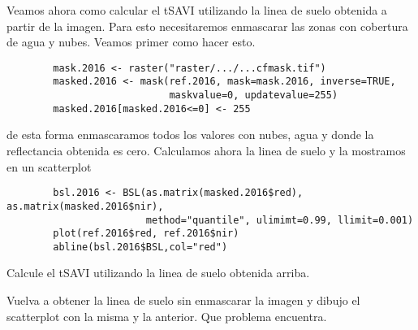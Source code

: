 \documentclass[a4paper]{article}
\begin{document}
\begin{exa}
    Veamos ahora como calcular el tSAVI utilizando la linea de suelo obtenida a
    partir de la imagen. Para esto necesitaremos enmascarar las zonas con
    cobertura de agua y nubes. Veamos primer como hacer esto.
    \begin{lstlisting}
        mask.2016 <- raster("raster/.../...cfmask.tif")
        masked.2016 <- mask(ref.2016, mask=mask.2016, inverse=TRUE,
                            maskvalue=0, updatevalue=255)
        masked.2016[masked.2016<=0] <- 255
    \end{lstlisting}
    de esta forma enmascaramos todos los valores con nubes, agua y donde la
    reflectancia obtenida es cero.
    Calculamos ahora la linea de suelo y la mostramos en un scatterplot
    \begin{lstlisting}
        bsl.2016 <- BSL(as.matrix(masked.2016$red), as.matrix(masked.2016$nir),
                        method="quantile", ulimimt=0.99, llimit=0.001)
        plot(ref.2016$red, ref.2016$nir)
        abline(bsl.2016$BSL,col="red")
    \end{lstlisting}
\end{exa}

\begin{act}
    Calcule el tSAVI utilizando la linea de suelo obtenida arriba.
\end{act}

\begin{act}
    Vuelva a obtener la linea de suelo sin enmascarar la imagen y dibujo el
    scatterplot con la misma y la anterior. Que problema encuentra.
\end{act}
\end{document}
